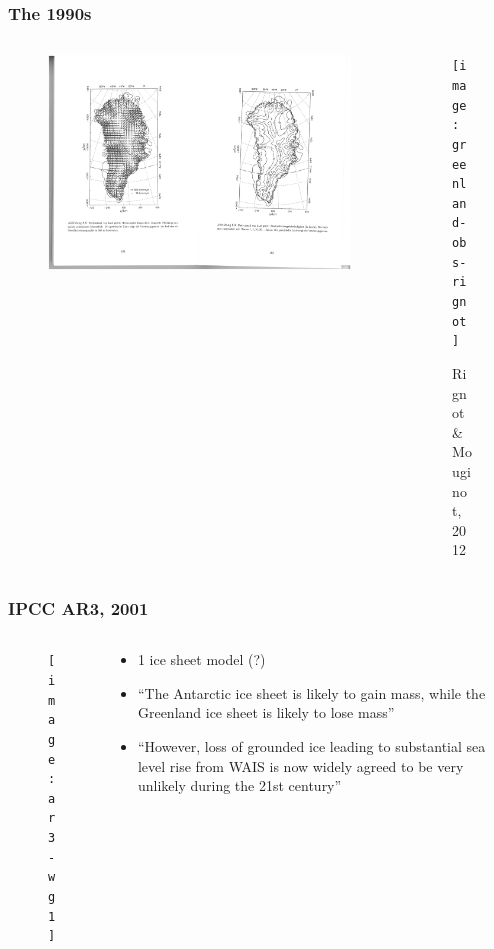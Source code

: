 \documentclass[hide notes,intlimits]{beamer}
\begin{document}
\begin{frame}
  \frametitle{The 1990s}
      \vspace{-2em}
  \begin{columns}[c]
    \begin{column}{.5\linewidth}
    \begin{figure}
        \includegraphics[height=0.75\textheight]{greve_1995_flow}
    \end{figure}
    \end{column}
    \begin{column}{.4\linewidth}
      \begin{figure}
      \texttt{[image: greenland-obs-rignot]}
      \caption{\tiny{Rignot \& Mouginot, 2012}}
      \end{figure}
    \end{column}
  \end{columns}
\end{frame}


\begin{frame}
  \frametitle{IPCC AR3, 2001}
  \begin{columns}[c]
    \begin{column}{.4\linewidth}
      \begin{figure}
        \texttt{[image: ar3-wg1]}
      \end{figure}
    \end{column}
    \begin{column}{.5\linewidth}
      \begin{itemize}
        \item 1 ice sheet model (?)
        \item ``The Antarctic ice sheet is likely to gain mass, while the Greenland ice sheet is likely to lose mass''
        \item ``However, loss of grounded ice leading to substantial sea level rise from WAIS is now widely agreed to be very unlikely during the 21st century''
      \end{itemize}
    \end{column}
\end{columns}
\end{frame}
\end{document}
